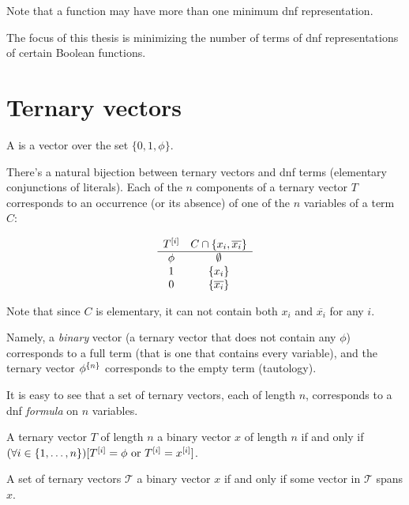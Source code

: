 Note that a function may have more than one minimum
\acrshort{dnf} representation.

The focus of this thesis is
minimizing the number of terms
of \acrshort{dnf} representations
of certain Boolean functions.

\section{Ternary vectors}

\begin{definition}
A 
is a vector over the set
$\{0, 1, \phi\}$.
\end{definition}

There's a natural bijection between ternary vectors
and \acrshort{dnf} terms
(elementary conjunctions of literals).
Each of the $n$ components of a ternary vector $T$
corresponds to an occurrence (or its absence)
of one of the $n$ variables of a term $C$:
\begin{center}
$$\begin{array}{cc}
T^{[i]} & C \cap \{x_i, \overline{x_i}\} \\
\hline
\phi & \emptyset \\
1 & \{x_i\} \\
0 & \{\overline{x_i}\}
\end{array}$$
\end{center}

Note that since $C$ is elementary,
it can not contain both $x_i$ and $\overline{x_i}$
for any $i$.

Namely,
a \emph{binary} vector
(a ternary vector that does not contain any $\phi$)
corresponds to a full term
(that is one that contains every variable),
and the ternary vector $\phi^{\{n\}}$
corresponds to the empty term (tautology).

It is easy to see that a set of ternary vectors,
each of length $n$,
corresponds to a \acrshort{dnf} \emph{formula}
on $n$ variables.

\begin{definition}
A ternary vector $T$ of length $n$ 
a binary vector $x$ of length $n$
if and only if
$(\forall i \in \{1, \ldots, n\}) [T^{[i]} = \phi \text{ or } T^{[i]} = x^{[i]}]$.

A set of ternary vectors $\mathcal{T}$
a binary vector $x$
if and only if
some vector in $\mathcal{T}$ spans $x$.
\end{definition}

